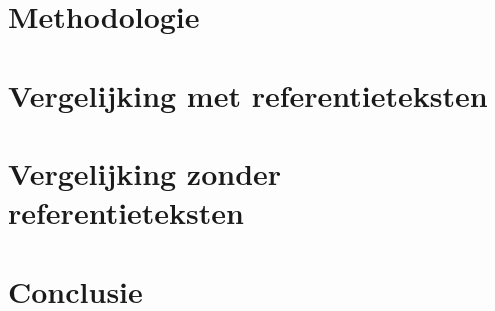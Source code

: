 \section{Methodologie}

\section{Vergelijking met referentieteksten}



\section{Vergelijking zonder referentieteksten}


\section{Conclusie}


